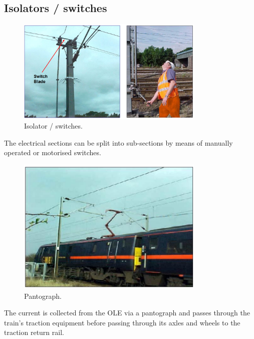 \subsection{Isolators / switches}
\begin{figure}[H]
    \centering
    \includegraphics[width = 0.8\textwidth]{img/figure145.png}
    \caption{Isolator / switches.}
\end{figure}
The electrical sections can be split into sub-sections by means of manually operated or motorised switches.
\begin{figure}[H]
    \centering
    \includegraphics[width = 0.8\textwidth]{img/figure146.png}
    \caption{Pantograph.}
\end{figure}
The current is collected from the OLE via a pantograph and passes through the train's traction equipment before passing through its axles and wheels to the traction return rail. 
